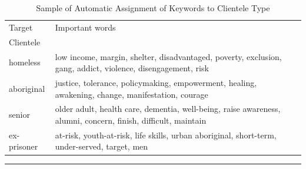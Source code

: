\documentclass{article}
\renewcommand{\arraystretch}{.2}
\begin{document}
\begin{table}[H]
\centering
\renewcommand{\arraystretch}{1.2}
\begin{tabular}{| P{1.6cm}|| P{10cm}|}

\hline
Target & Important words \\
Clientele &              \\
\hline \hline
homeless   & low income, margin, shelter, disadvantaged, poverty, exclusion, gang, addict, violence, disengagement, risk\\
\hline
aboriginal & justice, tolerance, policymaking, empowerment, healing, awakening, change, manifestation, courage \\
\hline
senior     & older adult, health care, dementia, well-being, raise awareness, alumni, concern, finish, difficult, maintain\\
\hline
ex-prisoner& at-risk, youth-at-risk, life skills, urban aboriginal, short-term, under-served, target, men\\



\hline 
\end{tabular}
\renewcommand{\arraystretch}{1}
\caption*{Sample of Automatic Assignment of Keywords to Clientele Type}
\label{tab:group}
\end{table}

\begin{center}
\rule{5cm}{0.4pt}
\end{center}
\end{document}
